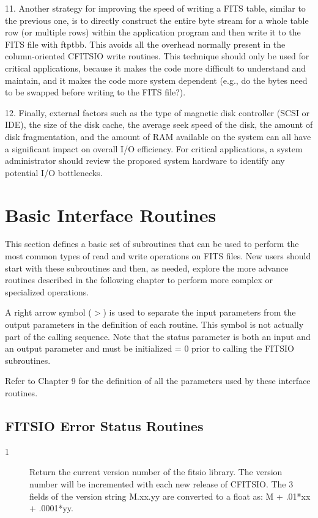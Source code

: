 \documentclass[11pt]{book}
\begin{document}
11. Another strategy for improving the speed of writing a FITS table,
similar to the previous one, is to directly construct the entire byte
stream for a whole table row (or multiple rows) within the application
program and then write it to the FITS file with
ftptbb.  This avoids all the overhead normally present
in the column-oriented CFITSIO write routines.  This technique should
only be used for critical applications, because it makes the code more
difficult to understand and maintain, and it makes the code more system
dependent (e.g., do the bytes need to be swapped before writing to the
FITS file?).

12.  Finally, external factors such as the type of magnetic disk
controller (SCSI or IDE), the size of the disk cache, the average seek
speed of the disk, the amount of disk fragmentation, and the amount of
RAM available on the system can all have a significant impact on
overall I/O efficiency.  For critical applications, a system
administrator should review the proposed system hardware to identify any
potential I/O bottlenecks.



\chapter{  Basic Interface Routines }

This section defines a basic set of subroutines that can be
used to perform the most common types of read and write operations
on FITS files.  New users should start with these subroutines and
then, as needed, explore the more advance routines described in
the following chapter to perform more complex or specialized operations.

A right arrow symbol ($>$) is used to separate the input parameters from
the output parameters in the  definition of each routine.  This symbol
is not actually part of the calling sequence.  Note that
the status parameter is both an input and an output parameter
and must be initialized = 0 prior to calling the FITSIO subroutines.

Refer to Chapter 9 for the definition of all the parameters
used by these interface routines.


\section{FITSIO Error Status Routines \label{FTVERS}}


\begin{description}
\item[1 ] Return the current version number of the fitsio library.
    The version number will be incremented with each new
   release of CFITSIO. The 3 fields of the version string M.xx.yy
   are converted to a float as: M + .01*xx + .0001*yy.
\end{description}
\end{document}
